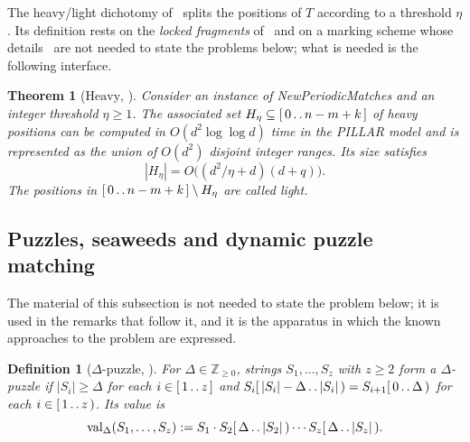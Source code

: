 \documentclass[10pt]{article}
\newtheorem{definition}{Definition}
\newtheorem{theorem}{Theorem}
\newcommand{\PILLAR}{\textnormal{PILLAR}}
\newcommand{\NPM}{\textnormal{New\hspace{0pt}Periodic\hspace{0pt}Matches}}
\newcommand{\val}{\operatorname{val}}
\begin{document}
The heavy\slash light dichotomy of~\cite[Sections 5, 6]{CKW22} splits the positions
of $T$ according to a threshold $\eta$. Its definition rests on the
\emph{locked fragments} of~\cite[Lemma 6.9]{CKW20} and on a marking scheme
whose details~\cite[Definitions 5.5, 5.8]{CKW22} are not needed to state the
problems below; what is needed is the following interface.

\begin{theorem}[$\mathrm{Heavy}$, {\cite[Lemmas 5.9, 5.10]{CKW22}}]\label{thm:heavy}
Consider an instance of \NPM{} and an integer threshold $\eta\ge1$. The
associated set $H_\eta\subseteq[\,0\mathinner{.\,.}n-m+k\,]$ of \emph{heavy positions} can
be computed in $O(d^2\log\log d)$ time in the \PILLAR{} model and is
represented as the union of $O(d^2)$ disjoint integer ranges. Its size
satisfies
\[
|H_\eta|=O\bigl((d^2/\eta+d)(d+q)\bigr).
\]
The positions in $[\,0\mathinner{.\,.}n-m+k\,]\setminus H_\eta$ are called \emph{light}.
\end{theorem}

\subsection{Puzzles, seaweeds and dynamic puzzle matching}\label{sec:seaweed}

The material of this subsection is not needed to state the problem below; it
is used in the remarks that follow it, and it is the apparatus in which the
known approaches to the problem are expressed.

\begin{definition}[$\Delta$-puzzle, {\cite[Definition 1.4]{CKW22}}]\label{def:puzzle}
For $\Delta\in\mathbb{Z}_{\ge0}$, strings $S_1,\ldots,S_z$ with $z\ge2$ form a
\emph{$\Delta$-puzzle} if $|S_i|\ge\Delta$ for each $i\in[\,1\mathinner{.\,.}z\,]$ and
$S_i[\,|S_i|-\Delta\mathinner{.\,.}|S_i|\,)=S_{i+1}[\,0\mathinner{.\,.}\Delta\,)$ for each
$i\in[\,1\mathinner{.\,.}z\,)$. Its \emph{value} is
\[
\val_\Delta(S_1,\ldots,S_z):=S_1\cdot S_2[\,\Delta\mathinner{.\,.}|S_2|\,)\cdots
S_z[\,\Delta\mathinner{.\,.}|S_z|\,).
\]
\end{definition}
\end{document}
